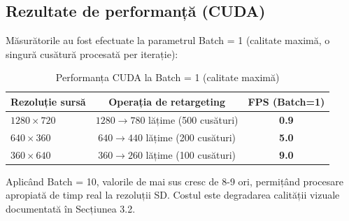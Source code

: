 \documentclass[12pt,a4paper]{article}
\begin{document}
\subsection{Rezultate de performanță (CUDA)}
Măsurătorile au fost efectuate la parametrul Batch = 1 (calitate maximă, o singură cusătură procesată per iterație):
\begin{table}[H]
\centering
\begin{tabular}{lcc}
\toprule
\textbf{Rezoluție sursă} & \textbf{Operația de retargeting} & \textbf{FPS (Batch=1)} \\
\midrule
$1280 \times 720$ & $1280 \to 780$ lățime (500 cusături) & \textbf{0.9} \\
$640 \times 360$  & $640 \to 440$ lățime (200 cusături) & \textbf{5.0} \\
$360 \times 640$  & $360 \to 260$ lățime (100 cusături) & \textbf{9.0} \\
\bottomrule
\end{tabular}
\caption{Performanța CUDA la Batch = 1 (calitate maximă)}
\end{table}
Aplicând Batch = 10, valorile de mai sus cresc de 8-9 ori, permițând procesare apropiată de timp real la rezoluții SD. Costul este degradarea calității vizuale documentată în Secțiunea 3.2.
\end{document}
